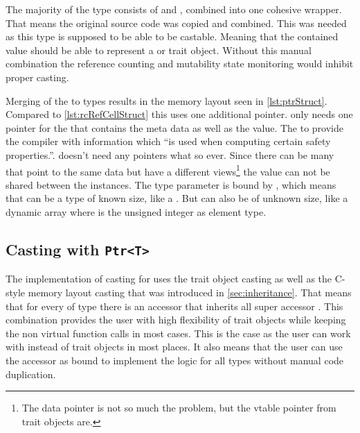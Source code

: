 \documentclass[thesis]{subfiles}
\begin{document}
    The majority of the \PtrT type consists of \RcT and \RefCellT, combined into one cohesive wrapper.
    That means the original source code was copied and combined.
    This was needed as this type is supposed to be able to be castable.
    Meaning that the contained value should be able to represent a \struct or trait object.
    Without this manual combination the reference counting and mutability state monitoring would inhibit proper casting.

    Merging of the to types results in the memory layout seen in \autoref{lst:ptrStruct}.
    Compared to \autoref{lst:rcRefCellStruct} this uses one additional pointer.
    \RcT only needs one pointer for the  that contains the meta data as well as the value.
    The  to provide the compiler with information which \enquote{is used when computing certain safety properties.}\autocite[std::marker::PhantomData]{rust-doc}.
    \RefCellT doesn't need any pointers what so ever.
    Since there can be many \PtrTs that point to the same data but have a different views\footnote{
      The data pointer is not so much the problem, but the vtable pointer from trait objects are.
    } the value can not be shared between the \PtrT instances.
    The type parameter \T is bound by , which means that \T can be a type of known size, like a \struct.
    But \T can also be of unknown size, like a dynamic array \codr{[usize]} where  is the unsigned integer as element type\autocite[std::marker::Sized]{rust-doc}.

  \subsection{Casting with \texttt{Ptr<T>}}
    The implementation of casting for \PtrT uses the trait object casting as well as the C-style memory layout casting that was introduced in \autoref{sec:inheritance}.
    That means that for every \struct of type \T there is an accessor \trait that inherits all super accessor \traits.
    This combination provides the user with high flexibility of trait objects while keeping the non virtual function calls in most cases.
    This is the case as the user can work with \structs instead of trait objects in most places.
    It also means that the user can use the accessor \traits as bound to implement the logic for all types without manual code duplication.

\end{document}
